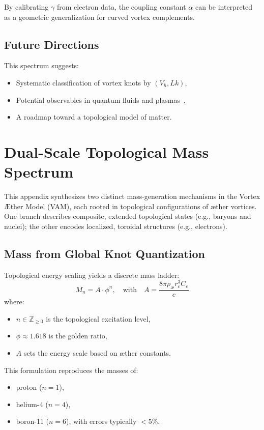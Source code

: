 By calibrating $\gamma$ from electron data, the coupling constant $\alpha$ can be interpreted as a geometric generalization for curved vortex complements.

\subsection{Future Directions}

This spectrum suggests:
\begin{itemize}
    \item Systematic classification of vortex knots by $(V_h, Lk)$,
    \item Potential observables in quantum fluids and plasmas~\cite{arnold1998topological},
    \item A roadmap toward a topological model of matter.
\end{itemize}



\section{Dual-Scale Topological Mass Spectrum}
This appendix synthesizes two distinct mass-generation mechanisms in the Vortex Æther Model (VAM), each rooted in topological configurations of æther vortices. One branch describes composite, extended topological states (e.g., baryons and nuclei); the other encodes localized, toroidal structures (e.g., electrons).

\subsection{Mass from Global Knot Quantization}

Topological energy scaling yields a discrete mass ladder:
\begin{equation}
M_n = A \cdot \phi^n, \quad \text{with} \quad
A = \frac{8\pi \rho_{\text{æ}} r_c^3 C_e}{c}
\end{equation}
where:
\begin{itemize}
  \item $n \in \mathbb{Z}_{\geq 0}$ is the topological excitation level,
  \item $\phi \approx 1.618$ is the golden ratio,
  \item $A$ sets the energy scale based on æther constants.
\end{itemize}

This formulation reproduces the masses of:
\begin{itemize}
  \item proton ($n=1$),
  \item helium-4 ($n=4$),
  \item boron-11 ($n=6$),
  with errors typically $< 5\%$.
\end{itemize}

